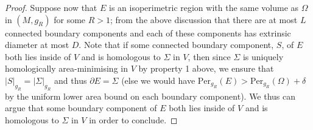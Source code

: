 \documentclass[12pt]{article}
\begin{document}
\begin{proof}
    \bigskip
    
    Suppose now that $E$ is an isoperimetric region with the same volume as $\Omega$ in $(M,g_R)$ for some $R > 1$; from the above discussion that there are at most $L$ connected boundary components and each of these components has extrinsic diameter at most $D$. Note that if some connected boundary component, $S$, of $E$ both lies inside of $V$ and is homologous to $\Sigma$ in $V$, then since $\Sigma$ is uniquely homologically area-minimising in $V$ by property 1 above, we ensure that $|S|_{g_R} = |\Sigma|_{g_R}$ and thus $\partial E = \Sigma$ 
    (else we would have $\mathrm{Per}_{g_R}(E) > \mathrm{Per}_{g_R}(\Omega) + \delta$ by the uniform lower area bound on each boundary component). We thus can argue that some boundary component of $E$ both lies inside of $V$ and is homologous to $\Sigma$ in $V$ in order to conclude. 
    
    \bigskip




    
    
    

\end{proof}
\end{document}

